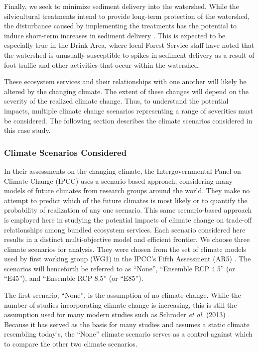 Finally, we seek to minimize sediment delivery into the watershed. While the silvicultural treatments intend to provide long-term protection of the watershed, the disturbance caused by implementing the treatments has the potential to induce short-term increases in sediment delivery \cite{o2005conceptual}. This is expected to be especially true in the Drink Area, where local Forest Service staff have noted that the watershed is unusually susceptible to spikes in sediment delivery as a result of foot traffic and other activities that occur within the watershed.

These ecosystem services and their relationships with one another will likely be altered by the changing climate. The extent of these changes will depend on the severity of the realized climate change. Thus, to understand the potential impacts, multiple climate change scenarios representing a range of severities must be considered. The following section describes the climate scenarios considered in this case study.

\subsubsection{Climate Scenarios Considered}
In their assessments on the changing climate, the Intergovernmental Panel on Climate Change (IPCC) uses a scenario-based approach, considering many models of future climates from research groups around the world. They make no attempt to predict which of the future climates is most likely or to quantify the probability of realization of any one scenario. This same scenario-based approach is employed here in studying the potential impacts of climate change on trade-off relationships among bundled ecosystem services. Each scenario considered here results in a distinct multi-objective model and efficient frontier. We choose three climate scenarios for analysis. They were chosen from the set of climate models used by first working group (WG1) in the IPCC's Fifth Assessment (AR5) \cite{ipcc2013climate}. The scenarios will henceforth be referred to as ``None'', ``Ensemble RCP 4.5'' (or ``E45''), and ``Ensemble RCP 8.5'' (or ``E85'').

The first scenario, ``None'', is the assumption of no climate change. While the number of studies incorporating climate change is increasing, this is still the assumption used for many modern studies such as Schroder \textit{et al}. (2013) \cite{schroder2016multi}. Because it has served as the basis for many studies and assumes a static climate resembling today's, the ``None'' climate scenario serves as a control against which to compare the other two climate scenarios.


